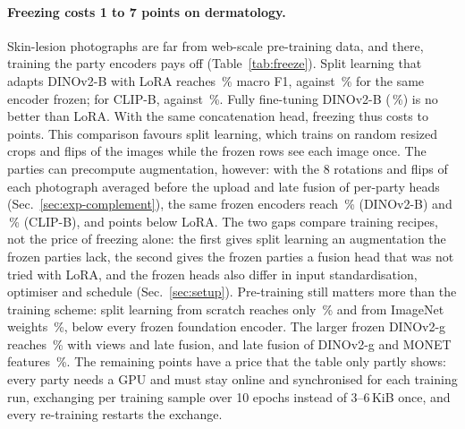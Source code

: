 \paragraph{Freezing costs 1 to 7 points on dermatology.}
Skin-lesion photographs are far from web-scale pre-training data, and there, training the party encoders pays off (Table~\ref{tab:freeze}). Split learning that adapts DINOv2-B with LoRA reaches \fzdinovTwoblora\,\% macro F1, against \fzdinovTwob\,\% for the same encoder frozen; for CLIP-B, \fzclipbSixteenlora{} against \fzclipbSixteen\,\%. Fully fine-tuning DINOv2-B (\fzdinovTwobft\,\%) is no better than LoRA. With the same concatenation head, freezing thus costs \fzGapCb{} to \fzGapB{} points. This comparison favours split learning, which trains on random resized crops and flips of the images while the frozen rows see each image once. The parties can precompute augmentation, however: with the 8 rotations and flips of each photograph averaged before the upload and late fusion of per-party heads (Sec.~\ref{sec:exp-complement}), the same frozen encoders reach \fzViewsB\,\% (DINOv2-B) and \fzViewsCb\,\% (CLIP-B), \fzGapViewsB{} and \fzGapViewsCb{} points below LoRA. The two gaps compare training recipes, not the price of freezing alone: the first gives split learning an augmentation the frozen parties lack, the second gives the frozen parties a fusion head that was not tried with LoRA, and the frozen heads also differ in input standardisation, optimiser and schedule (Sec.~\ref{sec:setup}). Pre-training still matters more than the training scheme: split learning from scratch reaches only \fzresnetEighteen\,\% and from ImageNet weights \fzresnetEighteenin\,\%, below every frozen foundation encoder. The larger frozen DINOv2-g reaches \mrGLateViews\,\% with views and late fusion, and late fusion of DINOv2-g and MONET features \mfGMLate\,\%. The remaining points have a price that the table only partly shows: every party needs a GPU and must stay online and synchronised for each training run, exchanging \fzUpdinovTwoblora{} per training sample over 10 epochs instead of 3--6\,KiB once, and every re-training restarts the exchange.

